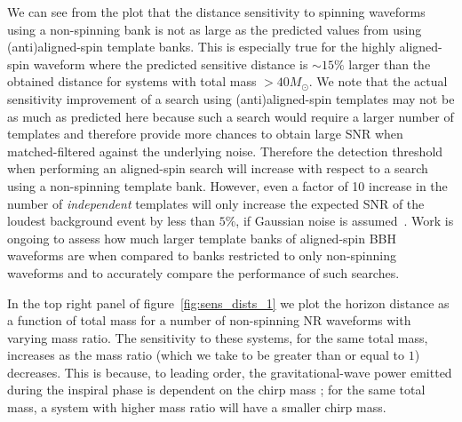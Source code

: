 \documentclass[12pt]{iopart}
\begin{document}
We can see from the plot 
that the distance sensitivity to spinning waveforms using a non-spinning bank 
is not as large as the predicted values from using (anti)aligned-spin template 
banks. 
This is especially true for the highly aligned-spin waveform where the 
predicted 
sensitive distance is $\sim 15\%$ larger than the obtained distance for systems 
with total mass $> 40M_{\odot}$. We note that the actual sensitivity 
improvement of a search using (anti)aligned-spin templates may not be as much 
as predicted here because such a search would require a larger number of 
templates and therefore provide more chances to obtain large SNR when 
matched-filtered against the underlying noise. Therefore the detection 
threshold 
when performing an aligned-spin search will increase with respect to a 
search using a non-spinning template bank. However, even a factor of 10 
increase in the number of \emph{independent} templates will only increase the 
expected SNR of the loudest background event by less than $5\%$, if 
Gaussian noise is assumed~\cite{Harry:2013tca}. Work is ongoing to assess how 
much larger template banks of aligned-spin BBH waveforms are when compared to 
banks restricted to only non-spinning waveforms and to accurately compare the 
performance of such searches.

In the top right panel of figure~\ref{fig:sens_dists_1} we plot the horizon 
distance as a function of total mass for a number of non-spinning NR waveforms 
with varying mass ratio. The sensitivity to these systems, for the same total 
mass, increases as the mass ratio (which we take to be greater than or equal to
$1$) decreases. This is because, to leading order, 
the gravitational-wave power emitted during the inspiral phase is dependent on 
the chirp mass \cite{Peters:1963ux}; for the same total mass, a system with 
higher mass ratio will have a smaller chirp mass.
\end{document}
